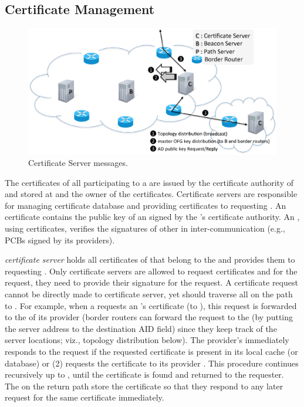 
\subsection{Certificate Management} 

\begin{figure}[ht]
\centering
\includegraphics[width=.9\columnwidth]{./fig/cs_message.eps}
\caption{Certificate Server messages.}\label{fig:cs-message}
\end{figure}

 The certificates of all participating \ADs to a \TD are issued by the certificate authority of \TD and stored at \TDC \ADs and the owner of the certificates. Certificate servers are responsible for managing certificate database and providing certificates to requesting \ADs. An \AD certificate contains the public key of an \AD signed by the \TD's certificate authority. An \AD, using \AD certificates, verifies the signatures of other \ADs in inter-\AD communication (e.g., PCBs signed by its providers).

{\em \TDC certificate server} holds all certificates of \ADs that belong to the \TD and provides them to requesting \ADs. Only certificate servers are allowed to request \AD certificates and for the request, they need to provide their signature for the request. A certificate request cannot be directly made to \TDC certificate server, yet should traverse all \CSs on the path to \TDC. For example, when a \STUB \AD requests an \AD's certificate (to \TDC), this request is forwarded to the \CS of its provider \AD (border routers can forward the request to the \CS (by putting the server address to the destination AID field) since they keep track of the server locations; viz., topology distribution below). The provider's \CS immediately responds to the request if the requested certificate is present in its local cache (or database) or (2) requests the certificate to its provider \AD. This procedure continues recursively up to \TDC, until the certificate is found and returned to the requester. The \CSs on the return path store the certificate so that they respond to any later request for  the same certificate immediately. 

